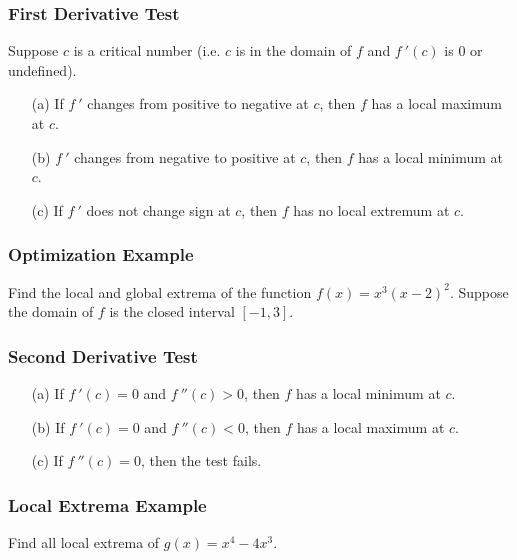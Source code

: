 \documentclass{beamer}
\begin{document}
\begin{frame}
\frametitle{First Derivative Test}
Suppose $c$ is a critical number (i.e. $c$ is in the domain of $f$ and $f\ '(c)$ is 0 or undefined).
\begin{itemize}
\item[(a)] If $f\ '$ changes from positive to negative at $c$, then $f$ has a local maximum at $c$.
\item[(b)] $f\ '$ changes from negative to positive at $c$, then $f$ has a local minimum at $c$.
\item[(c)] If $f\ '$ does not change sign at $c$, then $f$ has no local extremum at $c$.
\end{itemize}
\end{frame}

\begin{frame}[t]
\frametitle{Optimization Example}
\small
\begin{Example}
Find the local and global extrema of the function $f(x) = x^3(x-2)^2$. Suppose the domain of $f$ is the closed interval $[-1, 3]$.
\end{Example}
\end{frame}

\begin{frame}
\frametitle{Second Derivative Test}
\begin{enumerate}
\item[(a)] If $f\ '(c) = 0$ and $f\ ''(c) > 0$, then $f$ has a local minimum at $c$.
\item[(b)] If $f\ '(c) = 0$ and $f\ ''(c) < 0$, then $f$ has a local maximum at $c$.
\item[(c)] If $f\  ''(c) = 0$, then the test fails.
\end{enumerate}
\end{frame}

\begin{frame}[t]
\frametitle{Local Extrema Example}
\begin{Example}
Find all local extrema of $g(x) = x^4 - 4x^3$.
\end{Example}
\end{frame}


\end{document}
